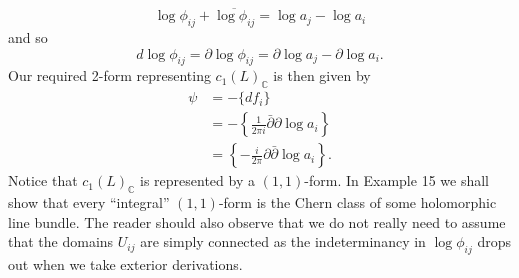 \begin{enumerate}[start=10]
\[
\log\phi_{ij}+\overline{\log\phi_{ij}}=\log a_j-\log a_i
\]
and so
\[
d\log\phi_{ij}=\partial\log\phi_{ij}=\partial\log a_j-\partial\log a_i.
\]
Our required 2-form representing $c_1(L)_{\mathbb C}$ is then given by
\[
\begin{aligned}
\psi&=-\{df_i\}\\
&=-\left\{\frac1{2\pi i}\bar\partial\partial\log a_i\right\}\\
&=\left\{-\frac i{2\pi}\partial\bar\partial\log a_i\right\}.
\end{aligned}
\]
Notice that $c_1(L)_{\mathbb C}$ is represented by a $(1,1)$-form. In Example 15 we shall show that every ``integral'' $(1,1)$-form is the Chern class of some holomorphic line bundle. The reader should also observe that we do not really need to assume that the domains $U_{ij}$ are simply connected as the indeterminancy in $\log\phi_{ij}$ drops out when we take exterior derivations.


\end{enumerate}
